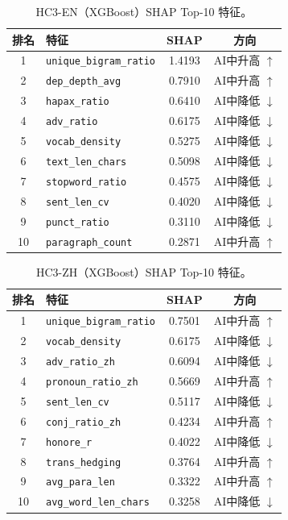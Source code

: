 \documentclass[sigconf]{acmart}
\begin{document}
\begin{table}[h]
\centering
\caption{HC3-EN（XGBoost）SHAP Top-10 特征。}
\label{tab:shap_en}
\small
\begin{tabular}{clcc}
\toprule
\textbf{排名} & \textbf{特征} & \textbf{SHAP} & \textbf{方向} \\
\midrule
1  & \texttt{unique\_bigram\_ratio}  & 1.4193 & AI中升高 $\uparrow$ \\
2  & \texttt{dep\_depth\_avg}        & 0.7910 & AI中升高 $\uparrow$ \\
3  & \texttt{hapax\_ratio}           & 0.6410 & AI中降低 $\downarrow$ \\
4  & \texttt{adv\_ratio}             & 0.6175 & AI中降低 $\downarrow$ \\
5  & \texttt{vocab\_density}         & 0.5275 & AI中降低 $\downarrow$ \\
6  & \texttt{text\_len\_chars}       & 0.5098 & AI中降低 $\downarrow$ \\
7  & \texttt{stopword\_ratio}        & 0.4575 & AI中降低 $\downarrow$ \\
8  & \texttt{sent\_len\_cv}          & 0.4020 & AI中降低 $\downarrow$ \\
9  & \texttt{punct\_ratio}           & 0.3110 & AI中降低 $\downarrow$ \\
10 & \texttt{paragraph\_count}       & 0.2871 & AI中升高 $\uparrow$ \\
\bottomrule
\end{tabular}
\end{table}

\begin{table}[h]
\centering
\caption{HC3-ZH（XGBoost）SHAP Top-10 特征。}
\label{tab:shap_zh}
\small
\begin{tabular}{clcc}
\toprule
\textbf{排名} & \textbf{特征} & \textbf{SHAP} & \textbf{方向} \\
\midrule
1  & \texttt{unique\_bigram\_ratio}  & 0.7501 & AI中升高 $\uparrow$ \\
2  & \texttt{vocab\_density}         & 0.6175 & AI中降低 $\downarrow$ \\
3  & \texttt{adv\_ratio\_zh}         & 0.6094 & AI中降低 $\downarrow$ \\
4  & \texttt{pronoun\_ratio\_zh}     & 0.5669 & AI中升高 $\uparrow$ \\
5  & \texttt{sent\_len\_cv}          & 0.5117 & AI中降低 $\downarrow$ \\
6  & \texttt{conj\_ratio\_zh}        & 0.4234 & AI中升高 $\uparrow$ \\
7  & \texttt{honore\_r}              & 0.4022 & AI中降低 $\downarrow$ \\
8  & \texttt{trans\_hedging}         & 0.3764 & AI中升高 $\uparrow$ \\
9  & \texttt{avg\_para\_len}         & 0.3322 & AI中升高 $\uparrow$ \\
10 & \texttt{avg\_word\_len\_chars}  & 0.3258 & AI中降低 $\downarrow$ \\
\bottomrule
\end{tabular}
\end{table}
\end{document}
